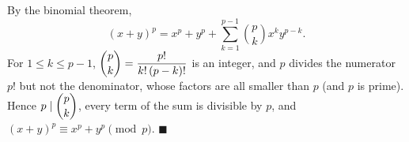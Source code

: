 By the binomial theorem,
\[(x+y)^p=x^p+y^p+\sum_{k=1}^{p-1}\binom pk x^ky^{p-k}.\]
For $1\le k\le p-1$, $\dbinom pk=\dfrac{p!}{k!\,(p-k)!}$ is an integer, and $p$ divides the numerator $p!$ but not the denominator, whose factors are all smaller than $p$ (and $p$ is prime). Hence $p\mid\dbinom pk$, every term of the sum is divisible by $p$, and $(x+y)^p\equiv x^p+y^p\pmod p$. $\blacksquare$
